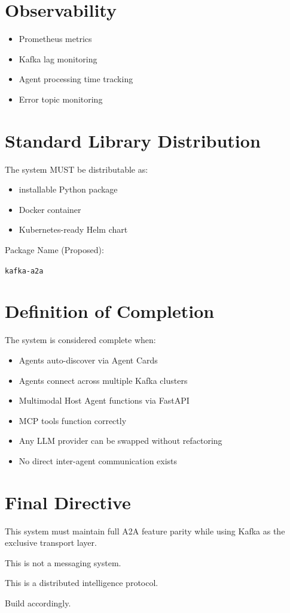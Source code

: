 \documentclass[12pt]{article}
\begin{document}
\section{Observability}

\begin{itemize}
    \item Prometheus metrics
    \item Kafka lag monitoring
    \item Agent processing time tracking
    \item Error topic monitoring
\end{itemize}

\section{Standard Library Distribution}

The system MUST be distributable as:

\begin{itemize}
    \item installable Python package
    \item Docker container
    \item Kubernetes-ready Helm chart
\end{itemize}

Package Name (Proposed):

\texttt{kafka-a2a}

\section{Definition of Completion}

The system is considered complete when:

\begin{itemize}
    \item Agents auto-discover via Agent Cards
    \item Agents connect across multiple Kafka clusters
    \item Multimodal Host Agent functions via FastAPI
    \item MCP tools function correctly
    \item Any LLM provider can be swapped without refactoring
    \item No direct inter-agent communication exists
\end{itemize}

\section{Final Directive}

This system must maintain full A2A feature parity while using Kafka as the exclusive transport layer.

This is not a messaging system.

This is a distributed intelligence protocol.

Build accordingly.
\end{document}
